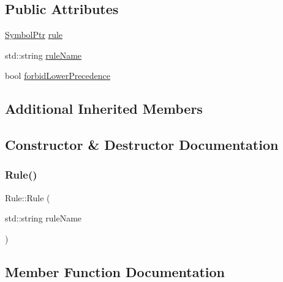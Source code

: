 \subsection*{Public Attributes}
\begin{DoxyCompactItemize}
\item 
\mbox{\hyperlink{namespace_erable_1_1_compiler_1_1_symbols_a8f0bc762f448ea4d84e8713ab3e140b9}{Symbol\+Ptr}} \mbox{\hyperlink{class_erable_1_1_compiler_1_1_symbols_1_1_rule_a12427a19c09e0286bb2b59cc78bd7fd5}{rule}}
\item 
std\+::string \mbox{\hyperlink{class_erable_1_1_compiler_1_1_symbols_1_1_rule_a099515287a10e4fd5412612d852ae2ca}{rule\+Name}}
\item 
bool \mbox{\hyperlink{class_erable_1_1_compiler_1_1_symbols_1_1_rule_a040b3ef6b4d88220130b8a8a0de2b299}{forbid\+Lower\+Precedence}}
\end{DoxyCompactItemize}
\subsection*{Additional Inherited Members}


\subsection{Constructor \& Destructor Documentation}
\mbox{\label{class_erable_1_1_compiler_1_1_symbols_1_1_rule_a0af25fe6f6c335a4d7c02c16118374e1}} 
\subsubsection{\texorpdfstring{Rule()}{Rule()}}
{\footnotesize\ttfamily Rule\+::\+Rule (\begin{DoxyParamCaption}\item[{std\+::string}]{rule\+Name }\end{DoxyParamCaption})\hspace{0.3cm}{\ttfamily [explicit]}}



\subsection{Member Function Documentation}
\mbox{\label{class_erable_1_1_compiler_1_1_symbols_1_1_rule_a33c0d38a60e6f703fd2d947d32a48504}} 
